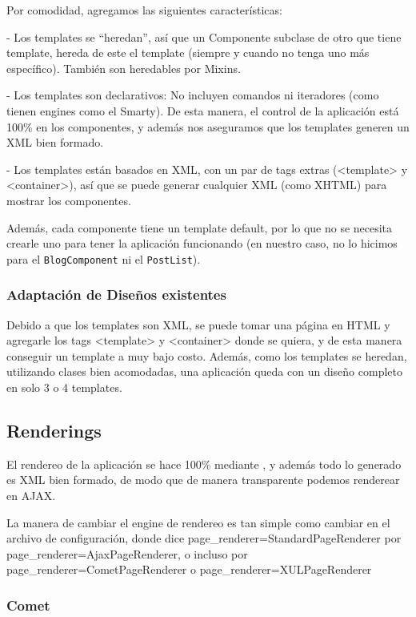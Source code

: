 Por comodidad, agregamos las siguientes características:

- Los templates se ``heredan'', así que un Componente subclase de otro que tiene template, hereda de este el template (siempre y cuando no tenga uno más específico). También son heredables por Mixins.

- Los templates son declarativos: No incluyen comandos ni iteradores (como tienen engines como el Smarty). De esta manera, el control de la aplicación está 100\% en los componentes, y además nos aseguramos que los templates generen un XML bien formado.

- Los templates están basados en XML, con un par de tags extras (<template> y <container>), así que se puede generar cualquier XML (como XHTML) para mostrar los componentes.

Además, cada componente tiene un template default, por lo que no se necesita crearle uno para tener la aplicación funcionando (en nuestro caso, no lo hicimos para el \verb"BlogComponent" ni el \verb"PostList").

\subsubsection{Adaptación de Diseños existentes}
\label{sub-templates-adapt}
Debido a que los templates son XML, se puede tomar una página en HTML y agregarle los tags <template> y <container> donde se quiera, y de esta manera conseguir un template a muy bajo costo. Además, como los templates se heredan, utilizando clases bien acomodadas, una aplicación queda con un diseño completo en solo 3 o 4 templates.

\subsection{Renderings}
\label{sub-render}
El rendereo de la aplicación se hace 100\% mediante \PWB, y además todo lo generado es XML bien formado, de modo que de manera transparente podemos renderear en AJAX.

La manera de cambiar el engine de rendereo es tan simple como cambiar en el archivo de configuración, donde dice page\_renderer=StandardPageRenderer por page\_renderer=AjaxPageRenderer, o incluso por page\_renderer=CometPageRenderer o page\_renderer=XULPageRenderer

\subsubsection{Comet}


